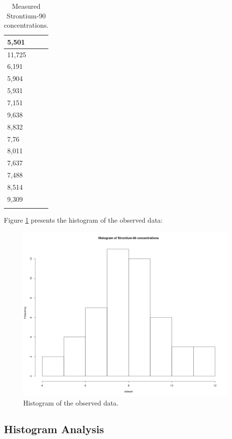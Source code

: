 \documentclass[12pt]{article}
\begin{document}
\begin{longtable}{|l|}
		5,501   \\ \hline
		11,725  \\ \hline
		6,191   \\ \hline
		5,904   \\ \hline
		5,931   \\ \hline
		7,151   \\ \hline
		9,638   \\ \hline
		8,832   \\ \hline
		7,76    \\ \hline
		8,011   \\ \hline
		7,637   \\ \hline
		7,488   \\ \hline
		8,514   \\ \hline
		9,309   \\ \hline
		\caption{Measured Strontium-90 concentrations.}
		\label{dataset_table}
\end{longtable}

Figure \ref{dataset_histogram} presents the histogram of the observed data:

\begin{figure}[h]
	\centering
	\includegraphics[scale=0.4]{images/Histogram_dataset.png}
	\caption{Histogram of the observed data.}
	\label{dataset_histogram}
\end{figure}

\subsection{Histogram Analysis}
\end{document}
